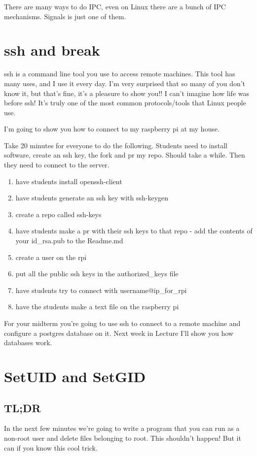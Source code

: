 \documentclass[12pt]{article}
\begin{document}
There are many ways to do IPC, even on Linux there are a bunch of IPC mechanisms. Signals is just one of them.

\section{ssh and break}
ssh is a command line tool you use to access remote machines. This tool has many uses, and I use it every day. I'm very surprised that so many of you don't know it, but that's fine, it's a pleasure to show you!! I can't imagine how life was before ssh! It's truly one of the most common protocols/tools that Linux people use. 

I'm going to show you how to connect to my raspberry pi at my house.

Take 20 minutes for everyone to do the following. Students need to install software, create an ssh key, the fork and pr my repo. Should take a while. Then they need to connect to the server.

\begin{center}
\begin{enumerate}
\item have students install openssh-client
\item have students generate an ssh key with ssh-keygen
\item create a repo called ssh-keys
\item have students make a pr with their ssh keys to that repo - add the contents of your id\_rsa.pub to the Readme.md
\item create a user on the rpi
\item put all the public ssh  keys in the authorized\_keys file
\item have students try to connect with username@ip\_for\_rpi
\item have the students make a text file on the raspberry pi
\end{enumerate}
\end{center}

For your midterm you're going to use ssh to connect to a remote machine and configure a postgres database on it.
Next week in Lecture I'll show you how databases work.


\section{SetUID and SetGID}
\subsection{TL;DR}
In the next few minutes we're going to write a program that you can run as a non-root user and delete  files belonging to root. This shouldn't happen! But it can if you know this cool trick. 
\end{document}
